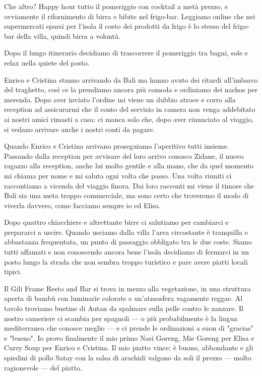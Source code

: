 Che altro? Happy hour tutto il pomeriggio con cocktail a metà prezzo, e ovviamente il rifornimento di birra e bibite nel frigo-bar. Leggiamo online che nei supermercati sparsi per l'isola il costo dei prodotti da frigo è lo stesso del frigo-bar della villa, quindi birra a volontà.

Dopo il lungo itinerario decidiamo di trascorrere il pomeriggio tra bagni, sole e relax nella quiete del posto.

Enrico e Cristina stanno arrivando da Bali ma hanno avuto dei ritardi all'imbarco del traghetto, così ce la prendiamo ancora più comoda e ordiniamo dei nachos per merenda. Dopo aver inviato l'ordine mi viene un dubbio atroce e corro alla reception ad assicurarmi che il conto del servizio in camera non venga addebitato ai nostri amici rimasti a casa: ci manca solo che, dopo aver rinunciato al viaggio, si vedano arrivare anche i nostri conti da pagare.

Quando Enrico e Cristina arrivano proseguiamo l'aperitivo tutti insieme. Passando dalla reception per avvisare del loro arrivo conosco Zidane, il nuovo ragazzo alla reception, anche lui molto gentile e alla mano, che da quel momento mi chiama per nome e mi saluta ogni volta che passo. Una volta riuniti ci raccontiamo a vicenda del viaggio finora. Dai loro racconti mi viene il timore che Bali sia una meta troppo commerciale, ma sono certo che troveremo il modo di viverla davvero, come facciamo sempre io ed Elisa.

Dopo quattro chiacchiere e altrettante birre ci salutiamo per cambiarci e prepararci a uscire. Quando usciamo dalla villa l'area circostante è tranquilla e abbastanza frequentata, un punto di passaggio obbligato tra le due coste. Siamo tutti affamati e non conoscendo ancora bene l'isola decidiamo di fermarci in un posto lungo la strada che non sembra troppo turistico e pare avere piatti locali tipici.

Il Gili Frame Resto and Bar si trova in mezzo alla vegetazione, in una struttura aperta di bambù con luminarie colorate e un'atmosfera vagamente reggae. Al tavolo troviamo bustine di Autan da spalmare sulla pelle contro le zanzare. Il nostro cameriere ci scambia per spagnoli — o più probabilmente è la lingua mediterranea che conosce meglio — e ci prende le ordinazioni a suon di "gracias" e "bueno". Io provo finalmente il mio primo Nasi Goreng, Mie Goreng per Elisa e Curry Soup per Enrico e Cristina. Il mio piatto vince: è buono, abbondante e gli spiedini di pollo Satay con la salsa di arachidi valgono da soli il prezzo — molto ragionevole — del piatto.


